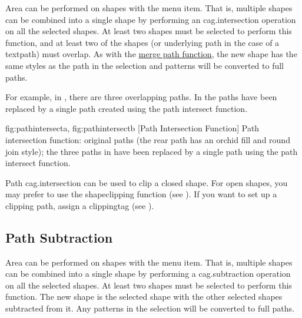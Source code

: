 
Area  can be performed on \glspl{shape} with
the  menu item. That is, multiple \glspl{shape}
can be combined into a single \gls*{shape} by performing an
\gls{cag.intersection} operation on all the selected \glspl*{shape}.  At
least two \glspl*{shape} must be selected to perform this function, 
and at least two of the shapes (or underlying path
in the case of a \gls{textpath}) must overlap.
As with the \hyperref[sec:mergepaths]{merge path function}, the new
\gls*{shape} has the same styles as the 
path in the selection and \glspl{pattern} will be converted to full
\glspl{path}.

For example, in ,
there are three overlapping paths.  In
 the paths have been replaced by
a single path created using the path intersect function.

{
  {fig:pathintersecta}{}{},
  {fig:pathintersectb}{}{}
}
[Path Intersection Function]
{Path intersection function: 
 original paths (the rear path has 
an orchid fill  and round join style); 
 the three paths 
in  have been
replaced by a single path using the path intersect function.}

Path \gls{cag.intersection} can be used to clip a closed
\gls{shape}. For open shapes, you may prefer to use the
\gls{shapeclipping} function (see ).
If you want to set up a clipping path, assign a \gls{clippingtag}
(see ).


\subsection{Path Subtraction}\label{sec:pathsubtract}


Area  can be performed on \glspl{shape} with
the  menu item. That is, multiple \glspl{shape}
can be combined into a single \gls*{shape} by performing a
\gls{cag.subtraction} operation on all the selected \glspl*{shape}.  At
least two \glspl*{shape} must be selected to perform this function.
The new shape is the  selected shape with
the other selected shapes subtracted from it. Any \glspl{pattern} in
the selection will be converted to full paths.

